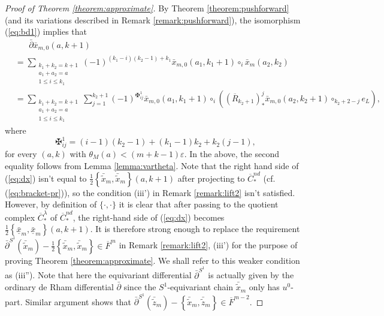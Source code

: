 \documentclass[a4paper]{article}
\numberwithin{equation}{section}
\begin{document}
\begin{proof}[Proof of Theorem \ref{theorem:approximate}]
By Theorem \ref{theorem:pushforward} (and its variations described in Remark \ref{remark:pushforward}), the isomorphism (\ref{eq:bd1}) implies that
\begin{equation}\label{eq:dx}
\begin{split}
&\;\;\;\;\;\;\bar{\partial}\bar{x}_{m,0}(a,k+1) \\
&=\sum_{\substack{k_1+k_2=k+1\\a_1+a_2=a\\1\leq i\leq k_1}}(-1)^{(k_1-i)(k_2-1)+k_1}\bar{x}_{m,0}(a_1,k_1+1)\circ_i\bar{x}_m(a_2,k_2) \\
&=\sum_{\substack{k_1+k_2=k+1\\a_1+a_2=a\\1\leq i\leq k_1}}\sum_{j=1}^{k_2+1}(-1)^{\maltese_{ij}^1}\bar{x}_{m,0}(a_1,k_1+1)\circ_i\left((\overline{R}_{k_2+1})^j_\ast\bar{x}_{m,0}(a_2,k_2+1)\circ_{k_2+2-j}e_L\right),
\end{split}
\end{equation}
where
\begin{equation}
\maltese_{ij}^1=(i-1)(k_2-1)+(k_1-1)k_2+k_2(j-1),
\end{equation}
for every $(a,k)$ with $\theta_M(a)<(m+k-1)\varepsilon$. In the above, the second equality follows from Lemma \ref{lemma:vartheta}. Note that the right hand side of (\ref{eq:dx}) isn't equal to $\frac{1}{2}\left\{\bar{\tilde{x}}_m,\bar{\tilde{x}}_m\right\}(a,k+1)$ after projecting to $\overline{C}_\ast^\mathit{nd}$ (cf. (\ref{eq:bracket-pr})), so the condition (iii') in Remark \ref{remark:lift2} isn't satisfied. However, by definition of $\{\cdot,\cdot\}$ it is clear that after passing to the quotient complex $\overline{C}_\ast^\lambda$ of $\overline{C}_\ast^\mathit{nd}$, the right-hand side of (\ref{eq:dx}) becomes $\frac{1}{2}\left\{\bar{\underline{x}}_m,\bar{\underline{x}}_m\right\}(a,k+1)$. It is therefore strong enough to replace the requirement $\bar{\partial}^{S^1}(\bar{\tilde{x}}_m)-\frac{1}{2}\left\{\bar{\tilde{x}}_m,\bar{\tilde{x}}_m\right\}\in\overline{F}^m$ in Remark \ref{remark:lift2}, (iii') for the purpose of proving Theorem \ref{theorem:approximate}. We shall refer to this weaker condition as (iii''). Note that here the equivariant differential $\bar{\partial}^{S^1}$ is actually given by the ordinary de Rham differential $\bar{\partial}$ since the $S^1$-equivariant chain $\bar{\tilde{x}}_m$ only has $u^0$-part. Similar argument shows that $\bar{\partial}^{S^1}(\bar{\tilde{z}}_m)-\left\{\bar{\tilde{x}}_m,\bar{\tilde{z}}_m\right\}\in\overline{F}^{m-2}$.


\end{proof}
\end{document}

